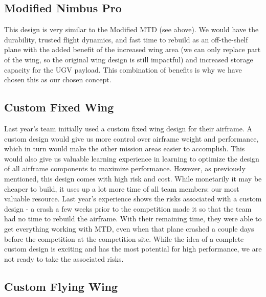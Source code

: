 \documentclass[]{auvsi_doc}
\begin{document}
\subsection*{Modified Nimbus Pro}

This design is very similar to the Modified MTD (see above). We would have the durability, trusted flight dynamics, and fast time to rebuild as an off-the-shelf plane with the added benefit of the increased wing area (we can only replace part of the wing, so the original wing design is still impactful) and increased storage capacity for the UGV payload. This combination of benefits is why we have chosen this as our chosen concept.

\subsection*{Custom Fixed Wing}

Last year's team initially used a custom fixed wing design for their airframe. A custom design would give us more control over airframe weight and performance, which in turn would make the other mission areas easier to accomplish. This would also give us valuable learning experience in learning to optimize the design of all airframe components to maximize performance. However, as previously mentioned, this design comes with high risk and cost. While monetarily it may be cheaper to build, it uses up a lot more time of all team members: our most valuable resource. Last year's experience shows the risks associated with a custom design - a crash a few weeks prior to the competition made it so that the team had no time to rebuild the airframe. With their remaining time, they were able to get everything working with MTD, even when that plane crashed a couple days before the competition at the competition site. While the idea of a complete custom design is exciting and has the most potential for high performance, we are not ready to take the associated risks.

\subsection*{Custom Flying Wing}
	
\end{document}

